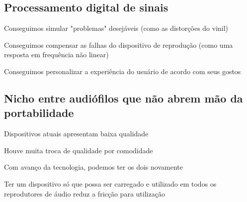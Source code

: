 \subsection{Processamento digital de sinais}
\color{orange}
Conseguimos simular "problemas" desejáveis (como as distorções do vinil)

Conseguimos compensar as falhas do dispositivo de reprodução (como uma resposta em frequência não linear)

Conseguimos personalizar a experiência do usuário de acordo com seus gostos
\subsection{Nicho entre audiófilos que não abrem mão da portabilidade}
Dispositivos atuais apresentam baixa qualidade

Houve muita troca de qualidade por comodidade

Com avanço da tecnologia, podemos ter os dois novamente

Ter um dispositivo só que possa ser carregado e utilizado em todos os reprodutores de áudio reduz a fricção para utilização

\color{black}

